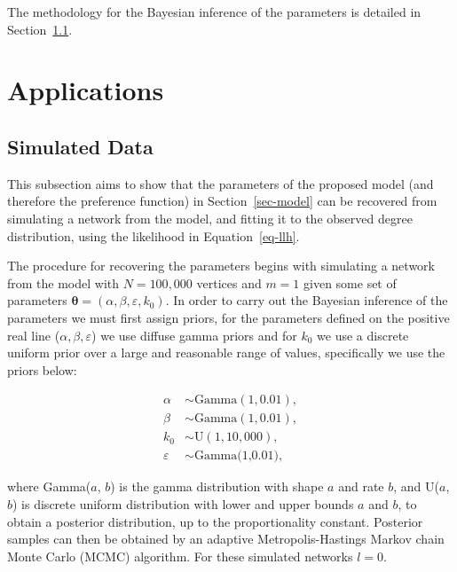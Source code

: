 \documentclass[
  sn-basic,
  10pt,
]{sn-jnl}
\theoremstyle{plain}
\theoremstyle{plain}
\theoremstyle{remark}
\begin{document}
The methodology for the Bayesian inference of the parameters is detailed
in Section~\ref{sec-sim}.

\section{Applications}\label{applications}

\subsection{Simulated Data}\label{sec-sim}

This subsection aims to show that the parameters of the proposed model
(and therefore the preference function) in Section~\ref{sec-model} can
be recovered from simulating a network from the model, and fitting it to
the observed degree distribution, using the likelihood in
Equation~\ref{eq-llh}.

The procedure for recovering the parameters begins with simulating a
network from the model with \(N=100,000\) vertices and \(m=1\) given
some set of parameters
\(\pmb\theta = (\alpha, \beta, \varepsilon, k_0)\). In order to carry
out the Bayesian inference of the parameters we must first assign
priors, for the parameters defined on the positive real line
(\(\alpha, \beta,\varepsilon\)) we use diffuse gamma priors and for
\(k_0\) we use a discrete uniform prior over a large and reasonable
range of values, specifically we use the priors below:

\begin{align*}
\alpha&\sim \text{Gamma}(1,0.01),\\
\beta &\sim  \text{Gamma}(1,0.01),\\
k_0 &\sim \text{U}(1,10,000),\\
\varepsilon &\sim \text{Gamma(1,0.01)},
\end{align*}

where Gamma(\(a\), \(b\)) is the gamma distribution with shape \(a\) and
rate \(b\), and U(\(a\), \(b\)) is discrete uniform distribution with
lower and upper bounds \(a\) and \(b\), to obtain a posterior
distribution, up to the proportionality constant. Posterior samples can
then be obtained by an adaptive Metropolis-Hastings Markov chain Monte
Carlo (MCMC) algorithm. For these simulated networks \(l=0\).
\end{document}
